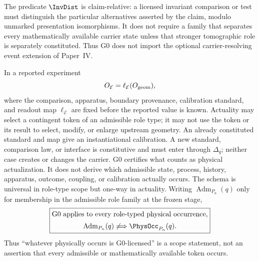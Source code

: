 \documentclass[12pt,a4paper]{article}
\begin{document}
\begin{mdframed}[style=postulatebox,nobreak=false]
\begin{principle}
The predicate \(\InvDist\) is claim-relative: a licensed invariant comparison
or test must distinguish the particular alternatives asserted by the claim,
modulo unmarked presentation isomorphisms.  It does not require a family that
separates every mathematically available carrier state unless that stronger
tomographic role is separately constituted.  Thus G0 does not import the
optional carrier-resolving event extension of Paper~IV.

In a reported experiment
\[
       O_{\mathcal E}=\ell_{\mathcal E}(O_{\rm geom}),
\]
where the comparison, apparatus, boundary provenance, calibration standard,
and readout map \(\ell_{\mathcal E}\) are fixed before the reported value is
known.  Actuality may select a contingent token of an admissible role type; it
may not use the token or its result to select, modify, or enlarge upstream
geometry.  An already constituted standard and map give an instantiational
calibration.  A new standard, comparison law, or interface is constitutive and
must enter through \(\Delta_q\); neither case creates or changes the carrier.
G0 certifies what counts as physical actualization.  It does not derive which
admissible state, process, history, apparatus, outcome, coupling, or
calibration actually occurs.  The schema is universal in role-type scope but
one-way in actuality.  Writing \(\operatorname{Adm}_{P_n}(q)\) only for
membership in the admissible role family at the frozen stage,
\[
 \boxed{\begin{gathered}
  \text{G0 applies to every role-typed physical occurrence},\\[2pt]
  \operatorname{Adm}_{P_n}(q)\not\Longrightarrow \PhysOcc_{P_n}(q).
 \end{gathered}}
\]
Thus ``whatever physically occurs is G0-licensed'' is a scope statement, not
an assertion that every admissible or mathematically available token occurs.


\end{principle}
\end{mdframed}
\end{document}
